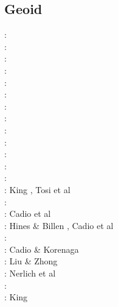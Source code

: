 \subsection{Geoid}

\begin{scriptsize}
\nineteeneightyfour: \cite{davi84}\cite{hage84}\cite{riff84}\cite{riha84}\\
\nineteeneightyfive: \cite{hacr85}\\
\nineteeneightysix: \cite{davi86}\\
\nineteeneightyeight: \cite{besz88}\cite{fope88}\\
\nineteenninetytwo: \cite{zhgu92}\cite{kiha92}\\
\nineteenninetythree: \cite{zhch93}\cite{rirl93}\\
\nineteenninetyfour: \cite{kiha94}\\
\nineteenninetyfive: \cite{king95}\cite{mopa95}\\
\nineteenninetysix: \cite{mogu96}\\
\nineteenninetyseven: \cite{wean97a}\\
\nineteenninetyeight: \cite{cava98}\cite{chki98}\\
\twothousandone: \cite{zhon01}\\
\twothousandeight: \cite{meco08}\\
\twothousandnine: King \cite{king09}, Tosi et al \cite{tocm09}\\
\twothousandten: \cite{ghbz10}\cite{spgs10b}\\
\twothousandeleven: Cadio et al \cite{capd11}\\
\twothousandtwelve: Hines \& Billen \cite{hibi12}, Cadio et al \cite{cabp12}\\
\twothousandthirteen: \cite{shsc13}\cite{chus13}\\
\twothousandfourteen: Cadio \& Korenaga \cite{cako14}\\
\twothousandfifteen: Liu \& Zhong \cite{lizh15}\\
\twothousandsixteen: Nerlich et al \cite{necg16}\\
\twothousandseventeen: \cite{grab17}\\
\twothousandeighteen: King \cite{king18}
\end{scriptsize}


